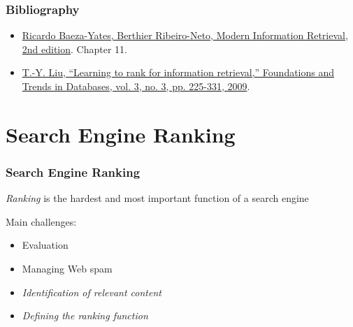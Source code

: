 \documentclass{beamer}
\subtitle{Learning to Rank}
\begin{document}
\maketitle



\makeoutline

\begin{frame}
    \frametitle{Bibliography}
    
    \begin{block}{}
        \begin{itemize}
        \item \href{http://www.mir2ed.org/}{Ricardo Baeza-Yates, Berthier
              Ribeiro-Neto, Modern Information Retrieval, 2nd edition}. Chapter
            11.
        \item \href{http://dx.doi.org/10.1561/1500000016}{T.-Y. Liu, ``Learning
              to rank for information retrieval,'' Foundations and Trends in
              Databases, vol. 3, no. 3, pp. 225-331, 2009}.
        \end{itemize}
    \end{block}
\end{frame}

\section{Search Engine Ranking}

\begin{frame}
  \frametitle{Search Engine Ranking}
  \emph{Ranking} is the hardest and most important function of a search engine
  \begin{block}{Main challenges:}
      \begin{itemize}
      \item Evaluation
      \item Managing Web spam
      \item \emph{Identification of relevant content}
      \item \emph{Defining the ranking function}
      \end{itemize}
  \end{block}
\end{frame}
\end{document}

